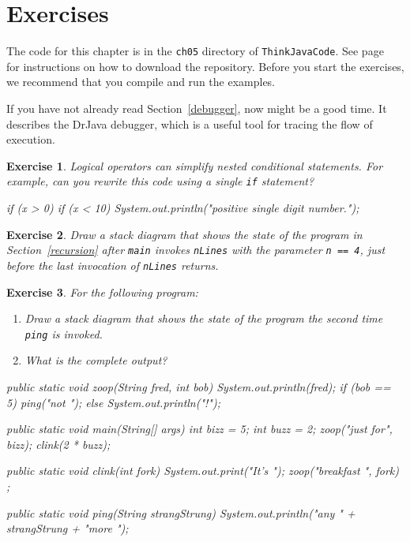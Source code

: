 \documentclass[12pt]{book}
\theoremstyle{exercise}
\newtheorem{exercise}{Exercise}[chapter]
\newcommand{\java}[1]{\verb"#1"}
\begin{document}
\section{Exercises}

The code for this chapter is in the {\tt ch05} directory of {\tt ThinkJavaCode}.
See page~\pageref{code} for instructions on how to download the repository.
Before you start the exercises, we recommend that you compile and run the examples.

If you have not already read Section~\ref{debugger}, now might be a good time.
It describes the DrJava debugger, which is a useful tool for tracing the flow of execution.


\begin{exercise}

Logical operators can simplify nested conditional statements.
For example, can you rewrite this code using a single \java{if} statement?

\begin{code}
    if (x > 0) {
        if (x < 10) {
            System.out.println("positive single digit number.");
        }
    }
\end{code}

\end{exercise}


\begin{exercise}

Draw a stack diagram that shows the state of the program in Section~\ref{recursion} after \java{main} invokes \java{nLines} with the parameter \java{n == 4}, just before the last invocation of \java{nLines} returns.

\end{exercise}


\begin{exercise}
For the following program:

\begin{enumerate}

\item Draw a stack diagram that shows the state of the program the {\it second} time \java{ping} is invoked.

\item What is the complete output?

\end{enumerate}

\begin{code}
    public static void zoop(String fred, int bob) {
        System.out.println(fred);
        if (bob == 5) {
            ping("not ");
        } else {
            System.out.println("!");
        }
    }

    public static void main(String[] args) {
        int bizz = 5;
        int buzz = 2;
        zoop("just for", bizz);
        clink(2 * buzz);
    }

    public static void clink(int fork) {
        System.out.print("It's ");
        zoop("breakfast ", fork) ;
    }

    public static void ping(String strangStrung) {
        System.out.println("any " + strangStrung + "more ");
    }
\end{code}
\end{exercise}
\end{document}
